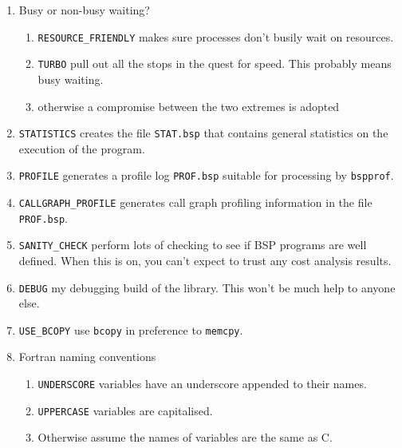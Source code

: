 \begin{enumerate}
\item Busy or non-busy waiting?
  \begin{enumerate}
  \item \texttt{RESOURCE\_FRIENDLY} makes sure processes don't busily
    wait on resources.

  \item \texttt{TURBO} pull out all the stops in the quest for speed.
    This probably means busy waiting.

  \item otherwise a compromise between the two extremes is adopted
  \end{enumerate}
  

\item \texttt{STATISTICS} creates the file \texttt{STAT.bsp} that
  contains general statistics on the execution of the program.

\item \texttt{PROFILE} generates a profile log \texttt{PROF.bsp}
  suitable for processing by \texttt{bspprof}.

\item \texttt{CALLGRAPH\_PROFILE} generates call graph profiling
information in the file \texttt{PROF.bsp}. 

\item \texttt{SANITY\_CHECK} perform lots of checking to see if BSP
  programs are well defined. When this is on, you can't expect to
  trust any cost analysis results.

\item \texttt{DEBUG} my debugging build of the library. This
  won't be much help to anyone else.

\item \texttt{USE\_BCOPY} use \texttt{bcopy} in preference to
  \texttt{memcpy}. 

\item Fortran naming conventions
  \begin{enumerate}
    \item \texttt{UNDERSCORE} variables have an underscore
      appended to their names.

    \item \texttt{UPPERCASE} variables are capitalised.

    \item Otherwise assume the names of variables are the same as C.
    \end{enumerate}
\end{enumerate}

